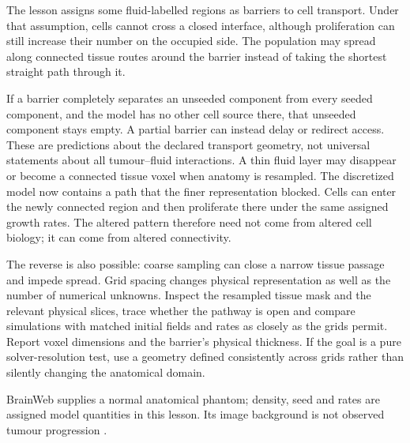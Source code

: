 \biomedicalanswer
{}
The lesson assigns some fluid-labelled regions as barriers to cell transport. Under that assumption, cells cannot cross a closed interface, although proliferation can still increase their number on the occupied side. The population may spread along connected tissue routes around the barrier instead of taking the shortest straight path through it.

If a barrier completely separates an unseeded component from every seeded component, and the model has no other cell source there, that unseeded component stays empty. A partial barrier can instead delay or redirect access. These are predictions about the declared transport geometry, not universal statements about all tumour--fluid interactions.
A thin fluid layer may disappear or become a connected tissue voxel when anatomy is resampled. The discretized model now contains a path that the finer representation blocked. Cells can enter the newly connected region and then proliferate there under the same assigned growth rates. The altered pattern therefore need not come from altered cell biology; it can come from altered connectivity.

The reverse is also possible: coarse sampling can close a narrow tissue passage and impede spread. Grid spacing changes physical representation as well as the number of numerical unknowns.
Inspect the resampled tissue mask and the relevant physical slices, trace whether the pathway is open and compare simulations with matched initial fields and rates as closely as the grids permit. Report voxel dimensions and the barrier's physical thickness. If the goal is a pure solver-resolution test, use a geometry defined consistently across grids rather than silently changing the anatomical domain.

BrainWeb supplies a normal anatomical phantom; density, seed and rates are assigned model quantities in this lesson. Its image background is not observed tumour progression \citep{lundervold2026glioma}.

